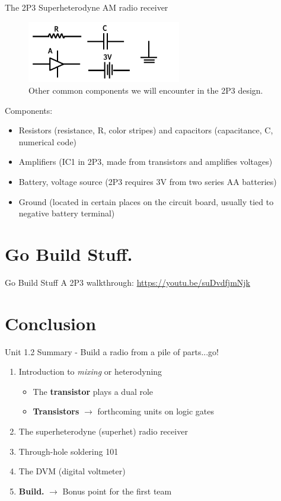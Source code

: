 \documentclass{beamer}
\begin{document}
\begin{frame}{The 2P3 Superheterodyne AM radio receiver}
\begin{figure}
\centering
\includegraphics[width=0.6\textwidth]{figures/otherComponents.pdf}
\caption{\label{fig:otherComponents} Other common components we will encounter in the 2P3 design.}
\end{figure}
\tiny
Components:
\begin{itemize}
\item Resistors (resistance, R, color stripes) and capacitors (capacitance, C, numerical code)
\item Amplifiers (IC1 in 2P3, made from transistors and amplifies voltages)
\item Battery, voltage source (2P3 requires 3V from two series AA batteries)
\item Ground (located in certain places on the circuit board, usually tied to negative battery terminal)
\end{itemize}
\end{frame}

\section{Go Build Stuff.}

\begin{frame}{Go Build Stuff}
A 2P3 walkthrough:
\url{https://youtu.be/suDvdfjmNjk}
\end{frame}

\section{Conclusion}

\begin{frame}{Unit 1.2 Summary - Build a radio from a pile of parts...go!}
\begin{enumerate}
\item Introduction to \textit{mixing} or \alert{heterodyning}
\begin{itemize}
\item The \textbf{transistor} plays a dual role
\item \textbf{Transistors} $\rightarrow$ forthcoming units on logic gates
\end{itemize}
\item The superheterodyne (superhet) radio receiver
\item Through-hole soldering 101
\item The DVM (digital voltmeter)
\item \textbf{Build.} $\rightarrow$ Bonus point for the first team
\end{enumerate}
\end{frame}
\end{document}
